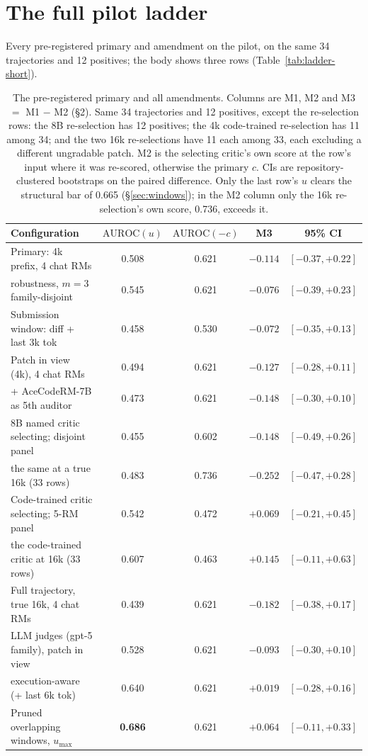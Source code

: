 \documentclass[11pt]{article}
\begin{document}
\section{The full pilot ladder}\label{sec:ladder-full}
Every pre-registered primary and amendment on the pilot, on the same 34 trajectories and 12 positives; the body shows three rows (Table~\ref{tab:ladder-short}).
\begin{table}[h]\centering\footnotesize
\begin{tabular}{lcccc}\toprule
Configuration & $\mathrm{AUROC}(u)$ & $\mathrm{AUROC}(-c)$ & M3 & 95\% CI \\\midrule
Primary: 4k prefix, 4 chat RMs & 0.508 & 0.621 & $-0.114$ & $[-0.37, +0.22]$ \\
\quad robustness, $m{=}3$ family-disjoint & 0.545 & 0.621 & $-0.076$ & $[-0.39, +0.23]$ \\
Submission window: diff + last 3k tok & 0.458 & 0.530 & $-0.072$ & $[-0.35, +0.13]$ \\
Patch in view (4k), 4 chat RMs & 0.494 & 0.621 & $-0.127$ & $[-0.28, +0.11]$ \\
\quad + AceCodeRM-7B as 5th auditor & 0.473 & 0.621 & $-0.148$ & $[-0.30, +0.10]$ \\
8B named critic selecting; disjoint panel & 0.455 & 0.602 & $-0.148$ & $[-0.49, +0.26]$ \\
\quad the same at a true 16k (33 rows) & 0.483 & 0.736 & $-0.252$ & $[-0.47, +0.28]$ \\
Code-trained critic selecting; 5-RM panel & 0.542 & 0.472 & $+0.069$ & $[-0.21, +0.45]$ \\
\quad the code-trained critic at 16k (33 rows) & 0.607 & 0.463 & $+0.145$ & $[-0.11, +0.63]$ \\
Full trajectory, true 16k, 4 chat RMs & 0.439 & 0.621 & $-0.182$ & $[-0.38, +0.17]$ \\
LLM judges (gpt-5 family), patch in view & 0.528 & 0.621 & $-0.093$ & $[-0.30, +0.10]$ \\
\quad execution-aware (+ last 6k tok) & 0.640 & 0.621 & $+0.019$ & $[-0.28, +0.16]$ \\\midrule
Pruned overlapping windows, $u_{\max}$ & \textbf{0.686} & 0.621 & $+0.064$ & $[-0.11, +0.33]$ \\\bottomrule
\end{tabular}
\caption{The pre-registered primary and all amendments. Columns are M1, M2 and M3 $=$ M1 $-$ M2 (\S2). Same 34 trajectories and 12 positives, except the re-selection rows: the 8B re-selection has 12 positives; the 4k code-trained re-selection has 11 among 34; and the two 16k re-selections have 11 each among 33, each excluding a different ungradable patch. M2 is the selecting critic's own score at the row's input where it was re-scored, otherwise the primary $c$. CIs are repository-clustered bootstraps on the paired difference. Only the last row's $u$ clears the structural bar of 0.665 (\S\ref{sec:windows}); in the M2 column only the 16k re-selection's own score, 0.736, exceeds it.}\label{tab:ladder}\end{table}
\end{document}
